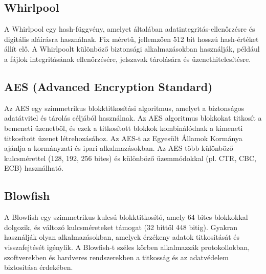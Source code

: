 \subsection {Whirlpool}
A Whirlpool egy hash-függvény, amelyet általában adatintegritás-ellenőrzésre és digitális aláírásra használnak. Fix méretű, jellemzően 512 bit hosszú hash-értéket állít elő. A Whirlpoolt különböző biztonsági alkalmazásokban használják, például a fájlok integritásának ellenőrzésére, jelszavak tárolására és üzenethitelesítésre.

\subsection {AES (Advanced Encryption Standard)}
 Az AES egy szimmetrikus blokktitkosítási algoritmus, amelyet a biztonságos adatátvitel és tárolás céljából használnak. Az AES algoritmus blokkokat titkosít a bemeneti üzenetből, és ezek a titkosított blokkok kombinálódnak a kimeneti titkosított üzenet létrehozásához. Az AES-t az Egyesült Államok Kormánya ajánlja a kormányzati és ipari alkalmazásokban. Az AES több különböző kulcsmérettel (128, 192, 256 bites) és különböző üzemmódokkal (pl. CTR, CBC, ECB) használható.

\subsection {Blowfish}
A Blowfish egy szimmetrikus kulcsú blokktitkosító, amely 64 bites blokkokkal dolgozik, és változó kulcsméreteket támogat (32 bittől 448 bitig). Gyakran használják olyan alkalmazásokban, amelyek érzékeny adatok titkosítását és visszafejtését igénylik. A Blowfish-t széles körben alkalmazzák protokollokban, szoftverekben és hardveres rendszerekben a titkosság és az adatvédelem biztosítása érdekében.
